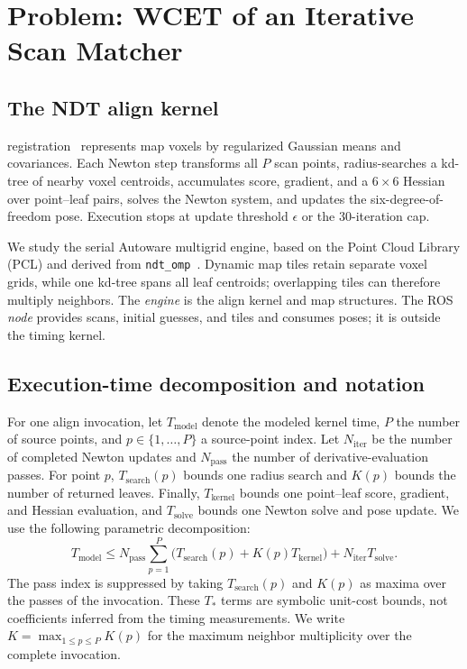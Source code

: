 \section{Problem: WCET of an Iterative Scan Matcher}
\label{sec:problem}

\subsection{The NDT align kernel}
\ndt{} registration~\cite{biber2003ndt,magnusson2009thesis} represents map voxels by
regularized Gaussian means and covariances. Each Newton step transforms all $P$ scan points,
radius-searches a kd-tree of nearby voxel centroids, accumulates score, gradient, and a
$6{\times}6$ Hessian over point--leaf pairs, solves the Newton system, and updates the
six-degree-of-freedom pose. Execution stops at update threshold $\epsilon$ or the
30-iteration cap.

We study the serial Autoware multigrid engine, based on the Point Cloud Library (PCL) and derived from
\texttt{ndt\_omp}~\cite{autoware,ndtomp}. Dynamic map tiles retain separate voxel grids,
while one kd-tree spans all leaf centroids; overlapping tiles can therefore multiply
neighbors. The \emph{engine} is the align kernel and map structures. The ROS \emph{node}
provides scans, initial guesses, and tiles and consumes poses; it is outside the timing
kernel.

\subsection{Execution-time decomposition and notation}
\label{sec:decomposition}
For one align invocation, let $T_{\mathrm{model}}$ denote the modeled kernel time, $P$ the
number of source points, and $p\in\{1,\ldots,P\}$ a source-point index. Let
$N_{\mathrm{iter}}$ be the number of completed Newton updates and $N_{\mathrm{pass}}$ the
number of derivative-evaluation passes. For point $p$, $T_{\mathrm{search}}(p)$ bounds one
radius search and $K(p)$ bounds the number of returned leaves. Finally,
$T_{\mathrm{kernel}}$ bounds one point--leaf score, gradient, and Hessian evaluation, and
$T_{\mathrm{solve}}$ bounds one Newton solve and pose update. We use the following
parametric decomposition:
\begin{equation}
 T_{\mathrm{model}}\le N_{\mathrm{pass}}\sum_{p=1}^{P}
 \bigl(T_{\mathrm{search}}(p)+K(p)T_{\mathrm{kernel}}\bigr)
 +N_{\mathrm{iter}}T_{\mathrm{solve}}.
 \label{eq:decomp}
\end{equation}
The pass index is suppressed by taking $T_{\mathrm{search}}(p)$ and $K(p)$ as
maxima over the passes of the invocation. These $T_*$ terms are symbolic unit-cost bounds,
not coefficients inferred from the timing measurements. We write
$K=\max_{1\le p\le P}K(p)$ for the maximum neighbor multiplicity over the complete
invocation.

